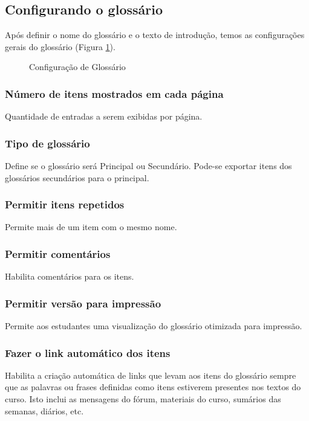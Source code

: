 \subsection{Configurando o glossário}
Após definir o nome do glossário e o texto de introdução, temos as configurações gerais do glossário (Figura \ref{fig:cap5_49}).
\begin{figure}[htbp]
 \begin{center}
  \caption{Configuração de Glossário}
  \label{fig:cap5_49}
 \end{center}
\end{figure}
\subsubsection{Número de itens mostrados em cada página}
Quantidade de entradas a serem exibidas por página.
\subsubsection{Tipo de glossário}
Define se o glossário será Principal ou Secundário. Pode-se exportar itens dos glossários secundários para o principal.
\subsubsection{Permitir itens repetidos}
Permite mais de um item com o mesmo nome.
\subsubsection{Permitir comentários}
Habilita comentários para os itens.
\subsubsection{Permitir versão para impressão}
Permite aos estudantes uma visualização do glossário otimizada para impressão.
\subsubsection{Fazer o link automático dos itens}
Habilita a criação automática de links que levam aos itens do glossário sempre que as palavras ou frases definidas como itens estiverem presentes nos textos do curso. Isto inclui as mensagens do fórum, materiais do curso, sumários das semanas, diários, etc.

